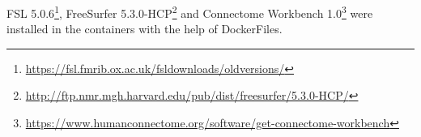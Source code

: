 FSL 5.0.6\footnote{\url{https://fsl.fmrib.ox.ac.uk/fsldownloads/oldversions/}}, FreeSurfer 5.3.0-HCP\footnote{\url{http://ftp.nmr.mgh.harvard.edu/pub/dist/freesurfer/5.3.0-HCP/}} and Connectome Workbench 1.0\footnote{\url{https://www.humanconnectome.org/software/get-connectome-workbench}} were installed in the containers with the help of DockerFiles.
